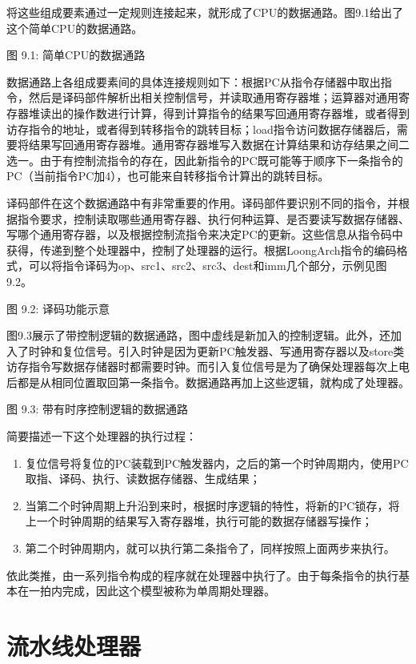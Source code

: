 \documentclass[]{ctexbook}
\providecommand{\tightlist}{%
  \setlength{\itemsep}{0pt}\setlength{\parskip}{0pt}}
\begin{document}
将这些组成要素通过一定规则连接起来，就形成了CPU的数据通路。图9.1给出了这个简单CPU的数据通路。

图 9.1: 简单CPU的数据通路

数据通路上各组成要素间的具体连接规则如下：根据PC从指令存储器中取出指令，然后是译码部件解析出相关控制信号，并读取通用寄存器堆；运算器对通用寄存器堆读出的操作数进行计算，得到计算指令的结果写回通用寄存器堆，或者得到访存指令的地址，或者得到转移指令的跳转目标；load指令访问数据存储器后，需要将结果写回通用寄存器堆。通用寄存器堆写入数据在计算结果和访存结果之间二选一。由于有控制流指令的存在，因此新指令的PC既可能等于顺序下一条指令的PC（当前指令PC加4），也可能来自转移指令计算出的跳转目标。

译码部件在这个数据通路中有非常重要的作用。译码部件要识别不同的指令，并根据指令要求，控制读取哪些通用寄存器、执行何种运算、是否要读写数据存储器、写哪个通用寄存器，以及根据控制流指令来决定PC的更新。这些信息从指令码中获得，传递到整个处理器中，控制了处理器的运行。根据LoongArch指令的编码格式，可以将指令译码为op、src1、src2、src3、dest和imm几个部分，示例见图9.2。

图 9.2: 译码功能示意

图9.3展示了带控制逻辑的数据通路，图中虚线是新加入的控制逻辑。此外，还加入了时钟和复位信号。引入时钟是因为更新PC触发器、写通用寄存器以及store类访存指令写数据存储器时都需要时钟。而引入复位信号是为了确保处理器每次上电后都是从相同位置取回第一条指令。数据通路再加上这些逻辑，就构成了处理器。

图 9.3: 带有时序控制逻辑的数据通路

简要描述一下这个处理器的执行过程：

\begin{enumerate}
\def\labelenumi{\arabic{enumi})}
\tightlist
\item
  复位信号将复位的PC装载到PC触发器内，之后的第一个时钟周期内，使用PC取指、译码、执行、读数据存储器、生成结果；
\item
  当第二个时钟周期上升沿到来时，根据时序逻辑的特性，将新的PC锁存，将上一个时钟周期的结果写入寄存器堆，执行可能的数据存储器写操作；
\item
  第二个时钟周期内，就可以执行第二条指令了，同样按照上面两步来执行。
\end{enumerate}

依此类推，由一系列指令构成的程序就在处理器中执行了。由于每条指令的执行基本在一拍内完成，因此这个模型被称为单周期处理器。

\hypertarget{sec-pipeline-cpu}{%
\section{流水线处理器}\label{sec-pipeline-cpu}}
\end{document}
